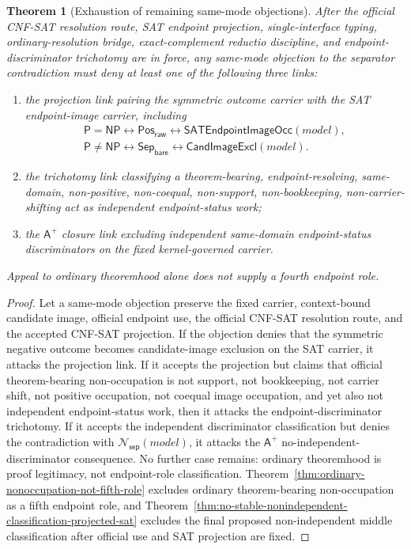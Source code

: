 \documentclass[11pt]{article}
\newtheorem{theorem}{Theorem}[section]
\theoremstyle{definition}
\theoremstyle{remark}
\newcommand{\PosRaw}{\mathsf{Pos}_{\mathsf{raw}}}
\newcommand{\SepBare}{\mathsf{Sep}_{\mathsf{bare}}}
\newcommand{\Aplus}{\mathsf{A}^{+}}
\newcommand{\Pclass}{\mathsf{P}}
\newcommand{\NPclass}{\mathsf{NP}}
\newcommand{\NoSepDisc}{\mathcal{N}_{\mathsf{sep}}}
\newcommand{\CandImageExcl}{\mathsf{CandImageExcl}}
\newcommand{\SATEndpointImageOcc}{\mathsf{SATEndpointImageOcc}}
\begin{document}
\begin{theorem}[Exhaustion of remaining same-mode objections]
\label{thm:remaining-same-mode-objections-exhausted}
After the official CNF-SAT resolution route, SAT endpoint projection, single-interface typing, ordinary-resolution bridge, exact-complement reductio discipline, and endpoint-discriminator trichotomy are in force, any same-mode objection to the separator contradiction must deny at least one of the following three links:
\begin{enumerate}[label=(\roman*)]
\item the projection link pairing the symmetric outcome carrier with the SAT endpoint-image carrier, including
\[
\begin{gathered}
  \Pclass=\NPclass\leftrightarrow\PosRaw\leftrightarrow\SATEndpointImageOcc(model),\\
  \Pclass\neq\NPclass\leftrightarrow\SepBare\leftrightarrow\CandImageExcl(model).
\end{gathered}
\]
\item the trichotomy link classifying a theorem-bearing, endpoint-resolving, same-domain, non-positive, non-coequal, non-support, non-bookkeeping, non-carrier-shifting act as independent endpoint-status work;
\item the \(\Aplus\) closure link excluding independent same-domain endpoint-status discriminators on the fixed kernel-governed carrier.
\end{enumerate}
Appeal to ordinary theoremhood alone does not supply a fourth endpoint role.
\end{theorem}

\begin{proof}
Let a same-mode objection preserve the fixed carrier, context-bound candidate image, official endpoint use, the official CNF-SAT resolution route, and the accepted CNF-SAT projection. If the objection denies that the symmetric negative outcome becomes candidate-image exclusion on the SAT carrier, it attacks the projection link. If it accepts the projection but claims that official theorem-bearing non-occupation is not support, not bookkeeping, not carrier shift, not positive occupation, not coequal image occupation, and yet also not independent endpoint-status work, then it attacks the endpoint-discriminator trichotomy. If it accepts the independent discriminator classification but denies the contradiction with \(\NoSepDisc(model)\), it attacks the \(\Aplus\) no-independent-discriminator consequence. No further case remains: ordinary theoremhood is proof legitimacy, not endpoint-role classification. Theorem~\ref{thm:ordinary-nonoccupation-not-fifth-role} excludes ordinary theorem-bearing non-occupation as a fifth endpoint role, and Theorem~\ref{thm:no-stable-nonindependent-classification-projected-sat} excludes the final proposed non-independent middle classification after official use and SAT projection are fixed.
\end{proof}
\end{document}

